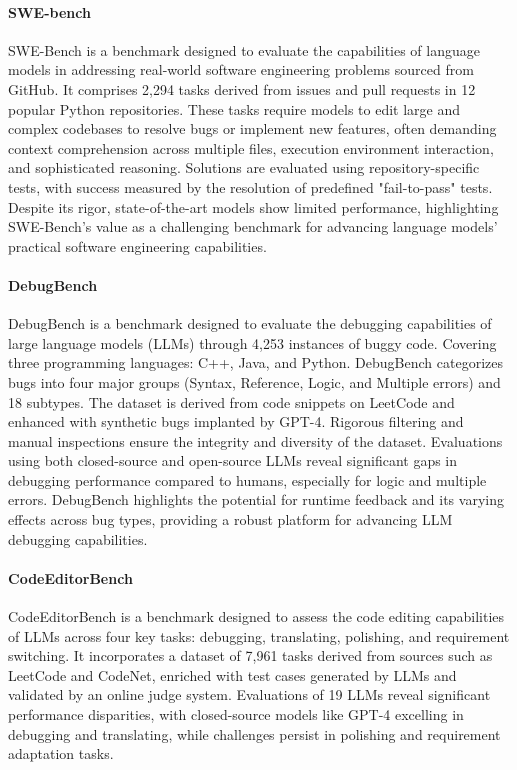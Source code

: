 \paragraph{SWE-bench \cite{jimenez2024swebench}}
SWE-Bench is a benchmark designed to evaluate the capabilities of language
models in addressing real-world software engineering problems sourced from
GitHub. It comprises 2,294 tasks derived from issues and pull requests in 12
popular Python repositories. These tasks require models to edit large and
complex codebases to resolve bugs or implement new features, often demanding
context comprehension across multiple files, execution environment interaction,
and sophisticated reasoning. Solutions are evaluated using repository-specific
tests, with success measured by the resolution of predefined "fail-to-pass"
tests. Despite its rigor, state-of-the-art models show limited performance,
highlighting SWE-Bench's value as a challenging benchmark for advancing language
models' practical software engineering capabilities.

\paragraph{DebugBench \cite{tian2024debugbench}}
DebugBench is a benchmark designed to evaluate the debugging capabilities of
large language models (LLMs) through 4,253 instances of buggy code. Covering
three programming languages: C++, Java, and Python. DebugBench categorizes bugs
into four major groups (Syntax, Reference, Logic, and Multiple errors) and 18
subtypes. The dataset is derived from code snippets on LeetCode and enhanced
with synthetic bugs implanted by GPT-4. Rigorous filtering and manual
inspections ensure the integrity and diversity of the dataset. Evaluations
using both closed-source and open-source LLMs reveal significant gaps in
debugging performance compared to humans, especially for logic and multiple
errors. DebugBench highlights the potential for runtime feedback and its
varying effects across bug types, providing a robust platform for advancing LLM
debugging capabilities.

\paragraph{CodeEditorBench \cite{guo2024codeeditorbench}}
CodeEditorBench is a benchmark designed to assess the code editing capabilities
of LLMs across four key tasks: debugging, translating,
polishing, and requirement switching. It incorporates a dataset of 7,961 tasks
derived from sources such as LeetCode and CodeNet, enriched with test cases
generated by LLMs and validated by an online judge system. Evaluations of 19
LLMs reveal significant performance disparities, with closed-source models like
GPT-4 excelling in debugging and translating, while challenges persist in
polishing and requirement adaptation tasks.

